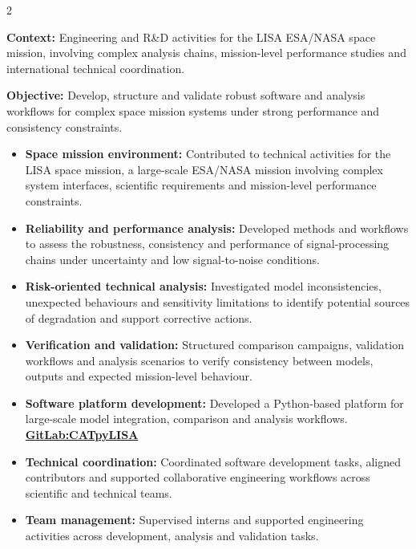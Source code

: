 \documentclass[8pt,a4paper,ragged2e,withhyper]{altacv}
\begin{document}
\begin{paracol}{2}
\divider


\textbf{Context:} Engineering and R\&D activities for the LISA ESA/NASA space mission, involving complex analysis chains, mission-level performance studies and international technical coordination.

\textbf{Objective:} Develop, structure and validate robust software and analysis workflows for complex space mission systems under strong performance and consistency constraints.

\begin{itemize}
\item \textbf{Space mission environment:} Contributed to technical activities for the LISA space mission, a large-scale ESA/NASA mission involving complex system interfaces, scientific requirements and mission-level performance constraints.
\item \textbf{Reliability and performance analysis:} Developed methods and workflows to assess the robustness, consistency and performance of signal-processing chains under uncertainty and low signal-to-noise conditions.
\item \textbf{Risk-oriented technical analysis:} Investigated model inconsistencies, unexpected behaviours and sensitivity limitations to identify potential sources of degradation and support corrective actions.
\item \textbf{Verification and validation:} Structured comparison campaigns, validation workflows and analysis scenarios to verify consistency between models, outputs and expected mission-level behaviour.
\item \textbf{Software platform development:} Developed a Python-based platform for large-scale model integration, comparison and analysis workflows. \textcolor{DarkPastelRed}{\href{https://gitlab.oca.eu/gboileau/lisa_l3_tools}{\bf GitLab:CATpyLISA}}
\item \textbf{Technical coordination:} Coordinated software development tasks, aligned contributors and supported collaborative engineering workflows across scientific and technical teams.
\item \textbf{Team management:} Supervised interns and supported engineering activities across development, analysis and validation tasks.
\end{itemize}


\end{paracol}
\end{document}
